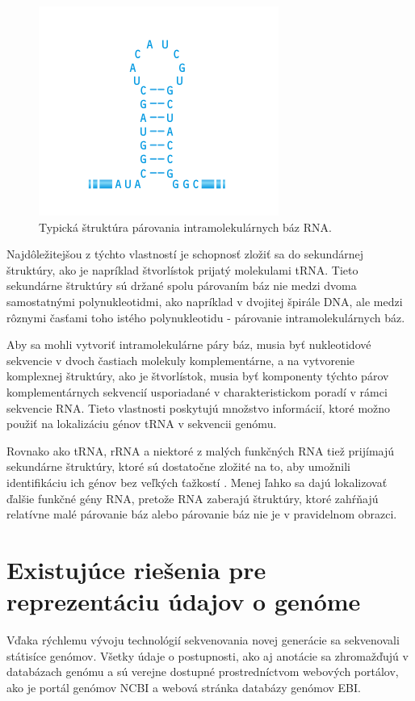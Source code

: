 \begin{figure}[!ht]
	\centering
	\includegraphics[width=.5\textwidth]{figures/rna.png}
	\caption{Typická štruktúra párovania intramolekulárnych báz RNA.\label{o:latex_friendly_zone}}
\end{figure}

Najdôležitejšou z týchto vlastností je schopnosť zložiť sa do sekundárnej štruktúry, ako je napríklad štvorlístok prijatý molekulami tRNA.
Tieto sekundárne štruktúry sú držané spolu párovaním báz nie medzi dvoma samostatnými polynukleotidmi, ako napríklad v dvojitej špirále DNA,
ale medzi rôznymi časťami toho istého polynukleotidu - párovanie intramolekulárnych báz.

Aby sa mohli vytvoriť intramolekulárne páry báz, musia byť nukleotidové sekvencie v dvoch častiach molekuly komplementárne,
a na vytvorenie komplexnej štruktúry, ako je štvorlístok, musia byť komponenty týchto párov komplementárnych sekvencií usporiadané v charakteristickom poradí v rámci sekvencie RNA.
Tieto vlastnosti poskytujú množstvo informácií, ktoré možno použiť na lokalizáciu génov tRNA v sekvencii genómu. 

Rovnako ako tRNA, rRNA a niektoré z malých funkčných RNA tiež prijímajú sekundárne štruktúry, ktoré sú dostatočne zložité na to, aby umožnili identifikáciu ich génov bez veľkých ťažkostí \cite{rna}.
Menej ľahko sa dajú lokalizovať ďalšie funkčné gény RNA, pretože RNA zaberajú štruktúry, ktoré zahŕňajú relatívne malé párovanie báz alebo párovanie báz nie je v pravidelnom obrazci.

\section{Existujúce riešenia pre reprezentáciu údajov o genóme}
Vďaka rýchlemu vývoju technológií sekvenovania novej generácie sa sekvenovali státisíce genómov.
Všetky údaje o postupnosti, ako aj anotácie sa zhromažďujú v databázach genómu a sú verejne dostupné
prostredníctvom webových portálov, ako je portál genómov NCBI a webová stránka databázy genómov EBI. %

